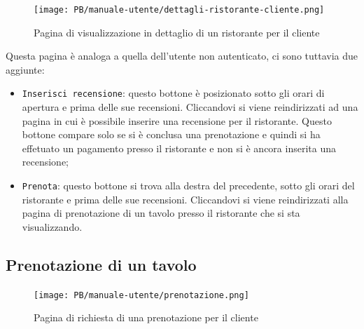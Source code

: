 \begin{figure}[htbp]
    \centering
	\texttt{[image: PB/manuale-utente/dettagli-ristorante-cliente.png]}
    \caption{Pagina di visualizzazione in dettaglio di un ristorante per il
	cliente}
\end{figure}
\newpage
Questa pagina è analoga a quella dell'utente non autenticato, ci sono tuttavia
due aggiunte:
\begin{itemize}
	\item \texttt{Inserisci recensione}: questo bottone è posizionato sotto gli orari di apertura e prima delle sue recensioni. Cliccandovi si viene reindirizzati ad una pagina in cui è possibile inserire una recensione per il ristorante. Questo bottone compare solo se si è conclusa una prenotazione e quindi si ha effetuato un pagamento presso il ristorante e non si è ancora inserita una recensione;

	\item \texttt{Prenota}: questo bottone si trova alla destra del precedente, sotto gli orari del ristorante e prima delle sue recensioni. Cliccandovi si viene reindirizzati alla pagina di prenotazione di un tavolo presso il ristorante che si sta visualizzando.
\end{itemize}

\subsection{Prenotazione di un tavolo}

\begin{figure}[htbp]
    \centering
	\texttt{[image: PB/manuale-utente/prenotazione.png]}
    \caption{Pagina di richiesta di una prenotazione per il cliente}
\end{figure}

